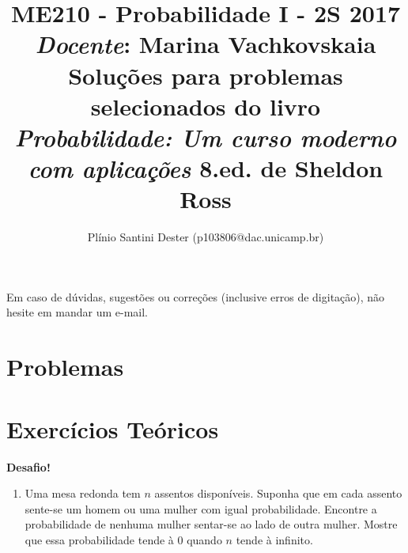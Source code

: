 


\title{	ME210 - Probabilidade I - 2S 2017\\
		{\large \textit{Docente}: Marina Vachkovskaia}\\[2mm]
		{\large Soluções para problemas selecionados do livro\\[-2mm]
        \textit{Probabilidade: Um curso moderno com aplicações}
        8.ed. de Sheldon Ross}\\
}
\author{Plínio Santini Dester (p103806@dac.unicamp.br)}



\maketitle

Em caso de dúvidas, sugestões ou correções (inclusive erros de digitação), não hesite em mandar um e-mail.

\setcounter{section}{1}
\section{Problemas}


\setcounter{section}{1}
\section{Exercícios Teóricos}


\vspace{3mm} {\LARGE \textbf{Desafio!}}
\begin{enumerate}
\item Uma mesa redonda tem $n$ assentos disponíveis. Suponha que em cada assento sente-se um homem ou uma mulher com igual probabilidade. Encontre a probabilidade de nenhuma mulher sentar-se ao lado de outra mulher. Mostre que essa probabilidade tende à $0$ quando $n$ tende à infinito.
\end{enumerate}

